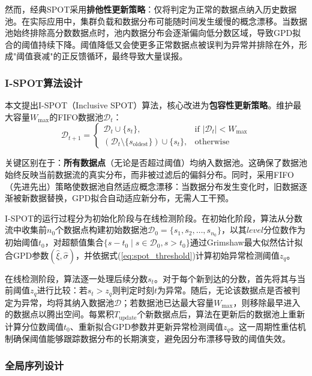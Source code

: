 \documentclass[10.5pt,a4paper,twocolumn]{ctexart}
\begin{document}
然而，经典SPOT采用\textbf{排他性更新策略}：仅将判定为正常的数据点纳入历史数据池。在实际应用中，集群负载和数据分布可能随时间发生缓慢的概念漂移。当数据池始终排除高分数数据点时，池内数据分布会逐渐偏向低分数区域，导致GPD拟合的阈值持续下降。阈值降低又会使更多正常数据点被误判为异常并排除在外，形成"阈值衰减"的正反馈循环，最终导致大量误报。

\subsubsection{I-SPOT算法设计}

本文提出I-SPOT（Inclusive SPOT）算法，核心改进为\textbf{包容性更新策略}。维护最大容量$W_{\max}$的FIFO数据池$\mathcal{D}_t$：
\begin{equation}
    \mathcal{D}_{t+1} = \begin{cases}
        \mathcal{D}_t \cup \{s_t\}, & \text{if } |\mathcal{D}_t| < W_{\max} \\
        (\mathcal{D}_t \setminus \{s_{\text{oldest}}\}) \cup \{s_t\}, & \text{otherwise}
    \end{cases}
\end{equation}

关键区别在于：\textbf{所有数据点}（无论是否超过阈值）均纳入数据池。这确保了数据池始终反映当前数据流的真实分布，而非被过滤后的偏斜分布。同时，采用FIFO（先进先出）策略使数据池自然适应概念漂移：当数据分布发生变化时，旧数据逐渐被新数据替换，GPD拟合自动适应新分布，无需人工干预。

I-SPOT的运行过程分为初始化阶段与在线检测阶段。在初始化阶段，算法从分数流中收集前$n_0$个数据点构建初始数据池$\mathcal{D}_0 = \{s_1, s_2, \ldots, s_{n_0}\}$，以其$\textit{level}$分位数作为初始阈值$t_0$，对超额值集合$\{s - t_0 \mid s \in \mathcal{D}_0, s > t_0\}$通过Grimshaw最大似然估计拟合GPD参数$(\hat{\xi}, \hat{\sigma})$，并依据式(\ref{eq:spot_threshold})计算初始异常检测阈值$z_q$。

在线检测阶段，算法逐一处理后续分数$s_t$。对于每个新到达的分数，首先将其与当前阈值$z_q$进行比较：若$s_t > z_q$则判定时刻$t$为异常。随后，无论该数据点是否被判定为异常，均将其纳入数据池$\mathcal{D}$；若数据池已达最大容量$W_{\max}$，则移除最早进入的数据点以腾出空间。每累积$T_{\text{update}}$个新数据点后，算法在更新后的数据池上重新计算分位数阈值$t_0$、重新拟合GPD参数并更新异常检测阈值$z_q$。这一周期性重估机制确保阈值能够跟踪数据分布的长期演变，避免因分布漂移导致的阈值失效。

\subsubsection{全局序列设计}
\end{document}
